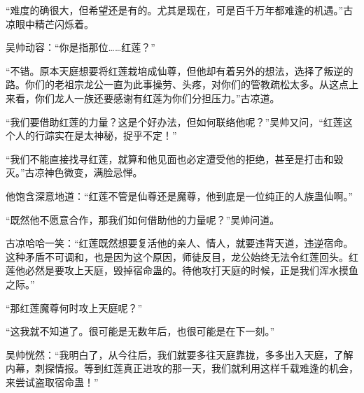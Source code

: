 \begin{this_body}
“难度的确很大，但希望还是有的。尤其是现在，可是百千万年都难逢的机遇。”古凉眼中精芒闪烁着。

吴帅动容：“你是指那位……红莲？”

“不错。原本天庭想要将红莲栽培成仙尊，但他却有着另外的想法，选择了叛逆的路。你们的老祖宗龙公一直为此事操劳、头疼，对你们的管教疏松太多。从这点上来看，你们龙人一族还要感谢有红莲为你们分担压力。”古凉道。

“我们要借助红莲的力量？这是个好办法，但如何联络他呢？”吴帅又问，“红莲这个人的行踪实在是太神秘，捉乎不定！”

“我们不能直接找寻红莲，就算和他见面也必定遭受他的拒绝，甚至是打击和毁灭。”古凉神色微变，满脸忌惮。

他饱含深意地道：“红莲不管是仙尊还是魔尊，他到底是一位纯正的人族蛊仙啊。”

“既然他不愿意合作，那我们如何借助他的力量呢？”吴帅问道。

古凉哈哈一笑：“红莲既然想要复活他的亲人、情人，就要违背天道，违逆宿命。这种矛盾不可调和，也是因为这个原因，师徒反目，龙公始终无法令红莲回头。红莲他必然是要攻上天庭，毁掉宿命蛊的。待他攻打天庭的时候，正是我们浑水摸鱼之际。”

“那红莲魔尊何时攻上天庭呢？”

“这我就不知道了。很可能是无数年后，也很可能是在下一刻。”

吴帅恍然：“我明白了，从今往后，我们就要多往天庭靠拢，多多出入天庭，了解内幕，刺探情报。等到红莲真正进攻的那一天，我们就利用这样千载难逢的机会，来尝试盗取宿命蛊！”

\end{this_body}

